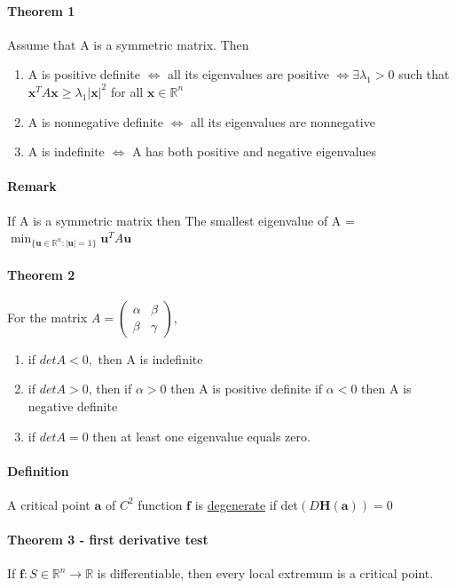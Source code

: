\documentclass[11pt]{article}
\newcommand{\tb}[1]{\textbf{#1}}
\newcommand{\real}[0]{\mathbb{R}}
\newcommand{\under}[1]{\underline{#1}}
\begin{document}
\paragraph{Theorem 1} Assume that A is a symmetric matrix. Then \newline
\begin{enumerate}
    \item A is positive definite $\iff$ all its eigenvalues are positive \newline
$\iff \exists \lambda_1 > 0$ such that $\tb{x}^TA\tb{x} \geq \lambda_1|\tb{x}|^2$ for all $\tb{x} \in \real^n $
    \item A is nonnegative definite $\iff$ all its eigenvalues are nonnegative \newline
    \item A is indefinite $\iff$ A has both positive and negative eigenvalues
\end{enumerate}
\paragraph{Remark} If A is a symmetric matrix then \newline
The smallest eigenvalue of A = $\min_{\{\tb{u}\in \real^n: |\tb{u}| = 1\}} \tb{u}^TA\tb{u}$
\paragraph{Theorem 2} For the matrix $A = \begin{pmatrix}
    \alpha & \beta \\
    \beta & \gamma 
\end{pmatrix}$,
\begin{enumerate}
    \item if $det A < 0,$ then A is indefinite
    \item if $det A > 0$, then
    \subitem if $\alpha > 0$ then A is positive definite
    \subitem if $\alpha < 0$ then A is negative definite
    \item if $det A = 0$ then at least one eigenvalue equals zero.
\end{enumerate}
\paragraph{Definition} A critical point $\tb{a}$ of $C^2$ function $\tb{f}$ is \under{degenerate} if det$(D\tb{H}(\tb{a})) = 0$
\paragraph{Theorem 3 - first derivative test} If $\tb{f}: S \in \real^n \rightarrow \real$ is differentiable, then every local extremum is a critical point.
\end{document}
